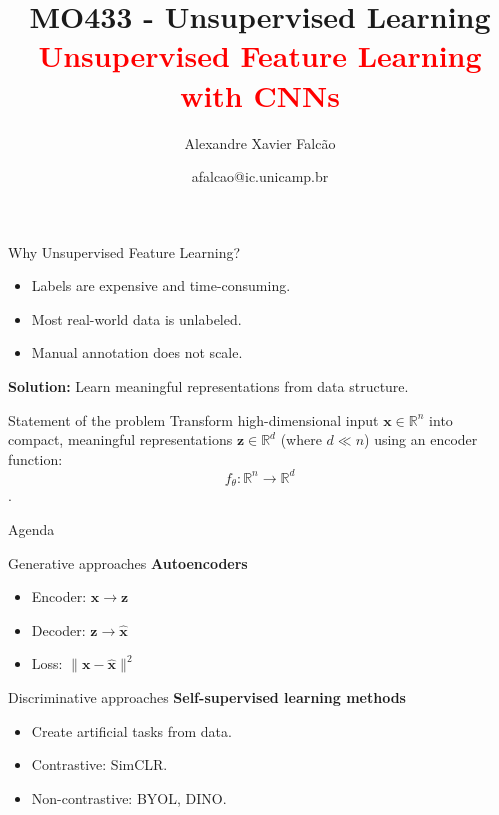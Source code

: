 \documentclass{beamer}
\title[MO433 - Unsupervised Learning]{MO433 - Unsupervised Learning \\ \textcolor{red}{Unsupervised Feature Learning with CNNs}}
\author{Alexandre Xavier Falc{\~{a}}o}
\institute[IC-UNICAMP]{Institute of Computing - UNICAMP}
\date{afalcao@ic.unicamp.br}
\begin{document}
\begin{frame}
\titlepage
\end{frame}
\begin{frame}{Why Unsupervised Feature Learning?}
\begin{itemize}
\item Labels are expensive and time-consuming.
  \vspace{0.3cm}
\item Most real-world data is unlabeled.
  \vspace{0.3cm}
\item Manual annotation does not scale.
\end{itemize}
\vspace{0.3cm}\pause \textbf{Solution:} Learn meaningful
representations from \alert{data structure}.
\vspace{0.5cm}\pause
\begin{block}{Statement of the problem}
Transform high-dimensional input $\mathbf{x} \in \mathbb{R}^n$ into
compact, meaningful representations $\mathbf{z} \in \mathbb{R}^d$
(where $d \ll n$) using an encoder function:
$$f_\theta: \mathbb{R}^n \rightarrow \mathbb{R}^d$$.
\end{block}

\end{frame}

\begin{frame}{Agenda}
\begin{block}{\alert{Generative approaches}}
\vspace{0.3cm}
\textbf{Autoencoders}
\begin{itemize}
\item Encoder: $\mathbf{x} \rightarrow \mathbf{z}$
\item Decoder: $\mathbf{z} \rightarrow \hat{\mathbf{x}}$
\item Loss: $\|\mathbf{x} - \hat{\mathbf{x}}\|^2$
\end{itemize}
\end{block}
\vspace{0.3cm} \pause
\begin{block}{\alert{Discriminative approaches}}
\vspace{0.3cm}
\textbf{Self-supervised learning methods}
\begin{itemize}
\item Create artificial tasks from data.
\item Contrastive: SimCLR.
\item Non-contrastive: BYOL, DINO.
\end{itemize}
\end{block}
\end{frame}
\end{document}
